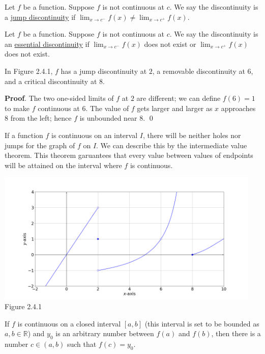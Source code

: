 \documentclass[11pt]{book}
\theoremstyle{break}
\theoremstyle{no_label}
\newcommand{\bbR}{\mathbb{R}}
\newcommand{\figtag}[1]{\\[-1.2em]Figure {#1}}
\numberwithin{equation}{section}
\begin{document}
\begin{definition}
    Let $f$ be a function. Suppose $f$ is not continuous at $c$. We say the discontinuity is a \underline{jump discontinuity} if $\displaystyle\lim_{x\to c^-}f(x)\ne\lim_{x\to c^+}f(x)$.
\end{definition}

\begin{definition}
    Let $f$ be a function. Suppose $f$ is not continuous at $c$. We say the discontinuity is an \underline{essential discontinuity} if $\displaystyle\lim_{x\to c^-}f(x)$ does not exist or $\displaystyle\lim_{x\to c^+}f(x)$ does not exist.
\end{definition}

\begin{example}
    In Figure 2.4.1, $f$ has a jump discontinuity at $2$, a removable discontinuity at $6$, and a critical discontinuity at $8$.
\end{example}
\textbf{Proof}. The two one-sided limits of $f$ at $2$ are different; we can define $f(6)=1$ to make $f$ continuous at $6$. The value of $f$ gets larger and larger as $x$ approaches $8$ from the left; hence $f$ is unbounded near $8$. \qed 

If a function $f$ is continuous on an interval $I$, there will be neither holes nor jumps for the graph of $f$ on $I$. We can describe this by the intermediate value theorem. This theorem garuantees that every value between values of endpoints will be attained on the interval where $f$ is continuous.

\begin{center}
    \includegraphics[width=0.95\textwidth]{discontinuity.png}\figtag{2.4.1}
\end{center}

\begin{theorem}
    If $f$ is continuous on a closed interval $[a, b]$ (this interval is set to be bounded as $a, b\in\bbR$) and $y_0$ is an arbitrary number between $f(a)$ and $f(b)$, then there is a number $c\in(a, b)$ such that $f(c)=y_0$.
\end{theorem}
\end{document}
